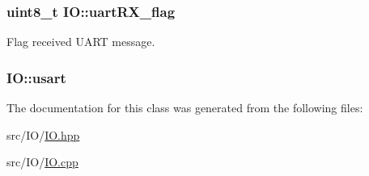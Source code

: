 \subsubsection[{\texorpdfstring{uart\+R\+X\+\_\+flag}{uartRX_flag}}]{\setlength{\rightskip}{0pt plus 5cm}uint8\+\_\+t I\+O\+::uart\+R\+X\+\_\+flag\hspace{0.3cm}{\ttfamily [private]}}\hypertarget{classIO_a041a386e8e27fe7486090449d2749ea2}{}\label{classIO_a041a386e8e27fe7486090449d2749ea2}


Flag received U\+A\+RT message. 

\subsubsection[{\texorpdfstring{usart}{usart}}]{ I\+O\+::usart\hspace{0.3cm}{\ttfamily [private]}}\hypertarget{classIO_a15d36e6764d393254ad99f8d7ec25f51}{}\label{classIO_a15d36e6764d393254ad99f8d7ec25f51}


The documentation for this class was generated from the following files\+:\begin{DoxyCompactItemize}
\item 
src/\+I\+O/\hyperlink{IO_8hpp}{I\+O.\+hpp}\item 
src/\+I\+O/\hyperlink{IO_8cpp}{I\+O.\+cpp}\end{DoxyCompactItemize}
